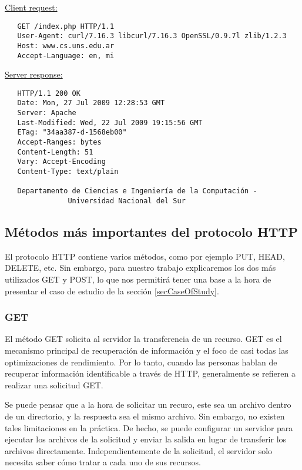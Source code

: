 \bigskip
\noindent
\underline{Client request:}
\begin{verbatim}
   GET /index.php HTTP/1.1
   User-Agent: curl/7.16.3 libcurl/7.16.3 OpenSSL/0.9.7l zlib/1.2.3
   Host: www.cs.uns.edu.ar
   Accept-Language: en, mi
  \end{verbatim}
\underline{Server response:}
\begin{verbatim}
   HTTP/1.1 200 OK
   Date: Mon, 27 Jul 2009 12:28:53 GMT
   Server: Apache
   Last-Modified: Wed, 22 Jul 2009 19:15:56 GMT
   ETag: "34aa387-d-1568eb00"
   Accept-Ranges: bytes
   Content-Length: 51
   Vary: Accept-Encoding
   Content-Type: text/plain

   Departamento de Ciencias e Ingeniería de la Computación -
               Universidad Nacional del Sur
\end{verbatim}


\subsection{Métodos más importantes del protocolo HTTP}

El protocolo HTTP contiene varios métodos, como por ejemplo PUT, HEAD, DELETE, etc. Sin
embargo, para nuestro trabajo explicaremos los dos más utilizados GET y POST, lo que
nos permitirá tener una base a la hora de presentar el caso de estudio de la 
sección \ref{secCaseOfStudy}.


\subsubsection*{GET}

El método GET solicita al servidor la transferencia de un recurso.
GET es el mecanismo principal de recuperación de información y el 
foco de casi todas las optimizaciones de rendimiento. Por lo tanto,
cuando las personas hablan de recuperar información identificable
a través de HTTP, generalmente se refieren a realizar una solicitud
GET.

Se puede pensar que a la hora de solicitar un recuro, este sea un archivo 
dentro de un directorio, y la respuesta sea el mismo archivo. Sin embargo, 
no existen tales limitaciones en la práctica. De hecho, se puede 
configurar un servidor para ejecutar los archivos de la solicitud y 
enviar la salida en lugar de transferir los archivos directamente. 
Independientemente de la solicitud, el servidor solo necesita saber 
cómo tratar a cada uno de sus recursos.

